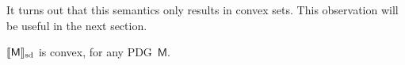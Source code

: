 \documentclass{article}
\newcommand\SD{_{\text{sd}}}
\newcommand{\bmu}{\boldsymbol{\mu}}
\newcommand{\Ed}{\mathcal E}
\newcommand{\sfM}{\mathsf M}
\newcommand{\MN}{PDG}
\newcommand{\MNs}{\MN s}
\numberwithin{equation}{section}
\begin{document}
\begin{revising}





	
	
	It turns out that this semantics only results in convex sets. This observation will be useful in the next section.
\end{revising}
	\begin{lemma}[restate=thmsetconvex] 
		\label{prop:convex}
		$\bbr{\sfM}\SD$ is convex, for any \MN\ $\sfM$.
	\end{lemma}%
\end{document}
